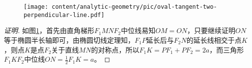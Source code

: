 \begin{figure}[htbp]
  \centering
\texttt{[image: content/analytic-geometry/pic/oval-tangent-two-perpendicular-line.pdf]}
\caption{}
\label{fig:oval-tangent-two-perpendicular-line}
\end{figure}

\begin{proof}[证明]
  如图\ref{fig:oval-tangent-two-perpendicular-line}，首先由直角梯形$F_1MNF_2$中位线易知$OM=ON$，只要继续证明$ON$等于椭圆半长轴即可，由椭圆切线定理知，$F_1P$延长后与$F_2N$的延长线相交于点$K$，则点$K$是点$F_2$关于直线$MN$的对称点，所以$F_1K=PF_1+PF_2=2a$，而三角形$F_1KF_2$中位线$ON=\frac{1}{2}F_1K=a$。
\end{proof}




